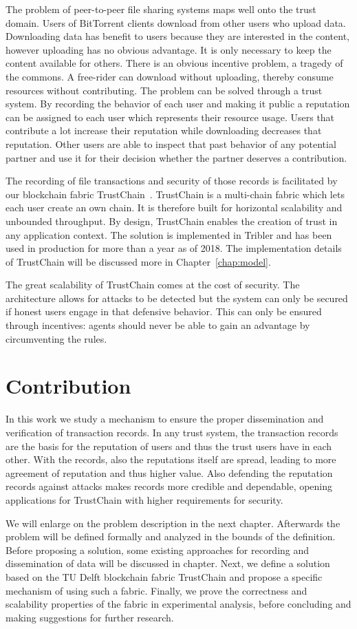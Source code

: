 The problem of peer-to-peer file sharing systems maps well onto the trust domain. Users of BitTorrent
clients download from other users who upload data. Downloading data has benefit to users because 
they are interested in the content, however uploading has no obvious advantage. It is only necessary
to keep the content available for others. There is an obvious incentive problem, a tragedy of the 
commons. A free-rider can download without uploading, thereby consume resources without contributing.
The problem can be solved through a trust system. By recording the behavior of each user and making
it public a reputation can be assigned to each user which represents their resource usage. Users 
that contribute a lot increase their reputation while downloading decreases that reputation. Other 
users are able to inspect that past behavior of any potential partner and use it for their decision 
whether the partner deserves a contribution. 

The recording of file transactions and security of those records is facilitated by our blockchain
fabric TrustChain~\cite{OTTE2017}. TrustChain is a multi-chain fabric which lets each user create
an own chain. It is therefore built for horizontal scalability and unbounded throughput. By design,
TrustChain enables the creation of trust in any application context. The solution is implemented
in Tribler and has been used in production for more than a year as of 2018. The implementation 
details of TrustChain will be discussed more in Chapter~\ref{chap:model}. 

The great scalability of TrustChain comes at the cost of security. The architecture allows for 
attacks to be detected but the system can only be secured if honest users engage in that defensive 
behavior. This can only be ensured through incentives: agents should never be able to gain an 
advantage by circumventing the rules. 

\section{Contribution}
In this work we study a mechanism to ensure the proper dissemination and verification of transaction
records. In any trust system, the transaction records are the basis for the reputation of users and 
thus the trust users have in each other. With the records, also the reputations itself are spread, 
leading to more agreement of reputation and thus higher value. Also defending the reputation records
against attacks makes records more credible and dependable, opening applications for TrustChain with
higher requirements for security.

We will enlarge on the problem description in the next chapter. Afterwards the problem will be defined
formally and analyzed in the bounds of the definition. Before proposing a solution, some existing
approaches for recording and dissemination of data will be discussed in chapter. Next, we define a
solution based on the TU Delft blockchain fabric TrustChain and propose a specific mechanism of 
using such a fabric. Finally, we prove the correctness and scalability properties of the fabric in
experimental analysis, before concluding and making suggestions for further research.